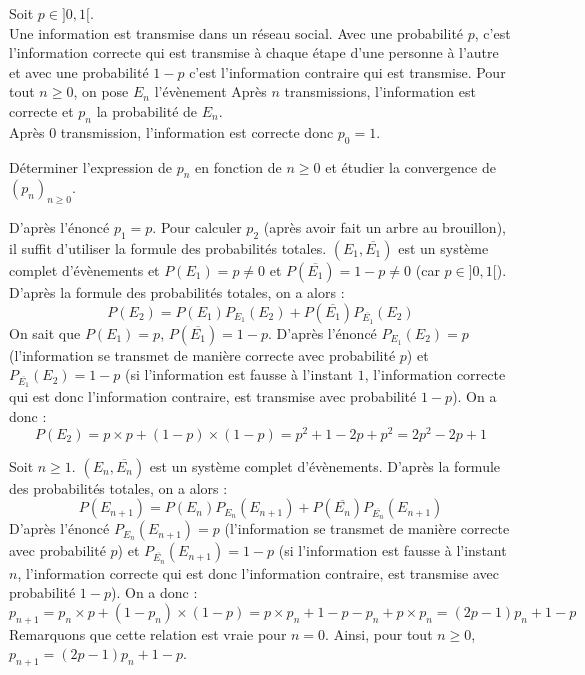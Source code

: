\documentclass[a4paper,10pt]{report}
\begin{document}
\begin{Exa} Soit $p \in ]0,1[$. \\
Une information est transmise dans un réseau social. Avec une probabilité $p$, c'est l'information correcte qui est transmise à chaque étape d'une personne à l'autre et avec une probabilité $1-p$ c'est l'information contraire qui est transmise. Pour tout $n \geq 0$, on pose $E_n$ l'évènement \og Après $n$ transmissions, l'information est correcte \fg et $p_n$ la probabilité de $E_n$. \\
\noindent Après 0 transmission, l'information est correcte donc $p_0=1$.

\medskip Déterminer l'expression de $p_n$ en fonction de $n \geq 0$ et étudier la convergence de $(p_n)_{n \geq 0}$.
\end{Exa}

\corr D'après l'énoncé $p_1=p$. Pour calculer $p_2$ (après avoir fait un arbre au brouillon), il suffit d'utiliser la formule des probabilités totales. $(E_1, \overline{E_1})$ est un système complet d'évènements et $P(E_1)=p \neq 0$ et $P(\overline{E_1})=1-p \neq 0$ (car $p \in ]0,1[$). D'après la formule des probabilités totales, on a alors :
\[ P(E_2)=P(E_1)P_{E_1}(E_2) + P( \overline{E_1}) P_{\overline{E_1}}(E_2) \]
On sait que $P(E_1)=p$, $P(\overline{E_1})=1-p$. D'après l'énoncé $P_{E_1}(E_2)=p$ (l'information se transmet de manière correcte avec probabilité $p$) et $P_{\overline{E_1}}(E_2)=1-p$ (si l'information est fausse à l'instant $1$, l'information correcte qui est donc l'information contraire, est transmise avec probabilité $1-p$). On a donc :
\[ P(E_2)= p\times p + (1-p)\times (1-p) = p^2 + 1 -2p+p^2 = 2p^2-2p+1\]

\medskip

\noindent Soit $n \geq 1$. $(E_n, \overline{E_n})$ est un système complet d'évènements. D'après la formule des probabilités totales, on a alors :
\[ P(E_{n+1})=P(E_n)P_{E_n}(E_{n+1}) + P( \overline{E_n}) P_{\overline{E_n}}(E_{n+1}) \]
D'après l'énoncé $P_{E_n}(E_{n+1})=p$ (l'information se transmet de manière correcte avec probabilité $p$) et $P_{\overline{E_n}}(E_{n+1})=1-p$ (si l'information est fausse à l'instant $n$, l'information correcte qui est donc l'information contraire, est transmise avec probabilité $1-p$). On a donc :
\[ p_{n+1} = p_n \times p + (1-p_n)\times (1-p) = p \times p_n + 1 -p -p_n+ p \times p_n = (2p-1)p_n + 1-p \]
Remarquons que cette relation est vraie pour $n=0$. Ainsi, pour tout $n \geq 0$, $p_{n+1}=(2p-1)p_n+1-p$.

\medskip
\end{document}
